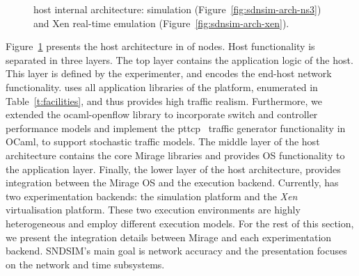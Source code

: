 \begin{figure}[ht] 
\centering
{}
\caption[\sdnsim host internal architecture]{\sdnsim host internal architecture: 
  simulation (Figure~\ref{fig:sdnsim-arch-ns3}) and Xen real-time
  emulation (Figure~\ref{fig:sdnsim-arch-xen}).}
\label{fig:sdnsim-arch}
\end{figure}


Figure~\ref{fig:sdnsim-arch} presents the host architecture in of \sdnsim
nodes. Host functionality is separated in three layers.  The top layer contains
the application logic of the host. This layer is defined by the experimenter,
and encodes the end-host network functionality. \sdnsim uses all application
libraries of the \mirage platform, enumerated in Table~\ref{t:facilities}, and
thus provides high traffic realism.  Furthermore, we extended the
ocaml-openflow library to incorporate switch and controller performance models
and implement the pttcp~ traffic generator functionality in
OCaml, to support stochastic traffic models.  The middle layer of the host
architecture contains the core Mirage libraries and provides OS functionality
to the application layer. Finally, the lower layer of the host architecture,
provides integration between the Mirage OS and the execution backend.
Currently, \sdnsim has two experimentation backends: the \textit{}
simulation platform  and the \textit{Xen} virtualisation platform. These two
execution environments are highly heterogeneous and employ different execution
models. For the rest of this section, we present the integration details
between Mirage and each experimentation backend.  SNDSIM's main goal is network
accuracy and the presentation focuses on the network and time subsystems.

